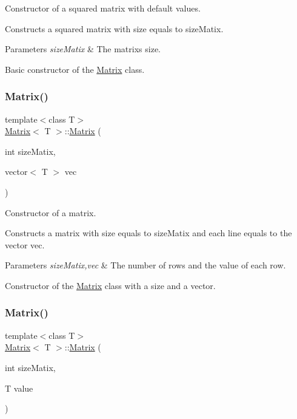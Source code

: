 Constructor of a squared matrix with default values. 

Constructs a squared matrix with size equals to size\+Matix.


\begin{DoxyParams}{Parameters}
{\em size\+Matix} & The matrix\textquotesingle{}s size.\\
\hline
\end{DoxyParams}
Basic constructor of the \mbox{\hyperlink{class_matrix}{Matrix}} class. \mbox{\label{class_matrix_ab2de60d5fd982131f2c83f2e0a935538}} 
\subsubsection{\texorpdfstring{Matrix()}{Matrix()}\hspace{0.1cm}{\footnotesize\ttfamily [3/4]}}
{\footnotesize\ttfamily template$<$class T$>$ \\
\mbox{\hyperlink{class_matrix}{Matrix}}$<$ T $>$\+::\mbox{\hyperlink{class_matrix}{Matrix}} (\begin{DoxyParamCaption}\item[{int}]{size\+Matix,  }\item[{vector$<$ T $>$}]{vec }\end{DoxyParamCaption})}



Constructor of a matrix. 

Constructs a matrix with size equals to size\+Matix and each line equals to the vector vec.


\begin{DoxyParams}{Parameters}
{\em size\+Matix,vec} & The number of rows and the value of each row.\\
\hline
\end{DoxyParams}
Constructor of the \mbox{\hyperlink{class_matrix}{Matrix}} class with a size and a vector. \mbox{\label{class_matrix_a4acc237a876c994c947079f7a0b9a148}} 
\subsubsection{\texorpdfstring{Matrix()}{Matrix()}\hspace{0.1cm}{\footnotesize\ttfamily [4/4]}}
{\footnotesize\ttfamily template$<$class T$>$ \\
\mbox{\hyperlink{class_matrix}{Matrix}}$<$ T $>$\+::\mbox{\hyperlink{class_matrix}{Matrix}} (\begin{DoxyParamCaption}\item[{int}]{size\+Matix,  }\item[{T}]{value }\end{DoxyParamCaption})}



